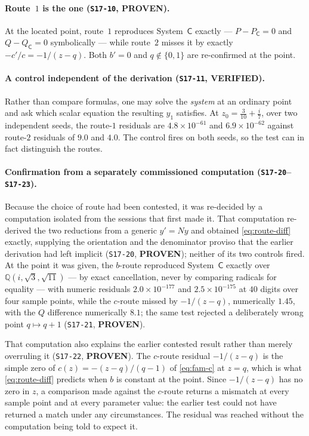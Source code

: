 \paragraph{Route~$1$ is the one (\texttt{S17-10}, \textbf{PROVEN}).}
At the located point, route~$1$ reproduces System~$\mathsf C$ exactly --- $P-
P_{\mathsf C}=0$ and $Q-Q_{\mathsf C}=0$ symbolically --- while route~$2$
misses it by exactly $-c'/c=-1/(z-q)$. Both $b'=0$ and $q\notin\{0,1\}$ are
re-confirmed at the point.

\paragraph{A control independent of the derivation (\texttt{S17-11},
\textbf{VERIFIED}).}
Rather than compare formulas, one may solve the \emph{system} at an ordinary
point and ask which scalar equation the resulting $y_1$ satisfies. At
$z_0=\tfrac{3}{10}+\tfrac{i}{7}$, over two independent seeds, the route-$1$
residuals are $4.8\times10^{-61}$ and $6.9\times10^{-62}$ against route-$2$
residuals of $9.0$ and $4.0$. The control fires on both seeds, so the test can
in fact distinguish the routes.

\paragraph{Confirmation from a separately commissioned computation
(\texttt{S17-20}--\texttt{S17-23}).}
Because the choice of route had been contested, it was re-decided by a
computation isolated from the sessions that first made it. That computation
re-derived the two reductions from a generic $y'=Ny$ and obtained
\eqref{eq:route-diff} exactly, supplying the orientation and the denominator
proviso that the earlier derivation had left implicit (\texttt{S17-20},
\textbf{PROVEN}); neither of its two controls fired. At the point it was given,
the $b$-route reproduced System~$\mathsf C$ exactly over
$\mathbb Q(i,\sqrt3,\sqrt{11})$ --- by exact cancellation, never by comparing
radicals for equality --- with numeric residuals $2.0\times10^{-177}$ and
$2.5\times10^{-175}$ at $40$ digits over four sample points, while the
$c$-route missed by $-1/(z-q)$, numerically $1.45$, with the $Q$ difference
numerically $8.1$; the same test rejected a deliberately wrong point
$q\mapsto q+1$ (\texttt{S17-21}, \textbf{PROVEN}).

That computation also explains the earlier contested result rather than merely
overruling it (\texttt{S17-22}, \textbf{PROVEN}). The $c$-route residual
$-1/(z-q)$ is the simple zero of $c(z)=-(z-q)/(q-1)$ of \eqref{eq:fam-c} at
$z=q$, which is what \eqref{eq:route-diff} predicts when $b$ is constant at the
point. Since $-1/(z-q)$ has no zero in $z$, a comparison made against the
$c$-route returns a mismatch at every sample point and at every parameter
value: the earlier test could not have returned a match under any
circumstances. The residual was reached without the computation being told to
expect it.

